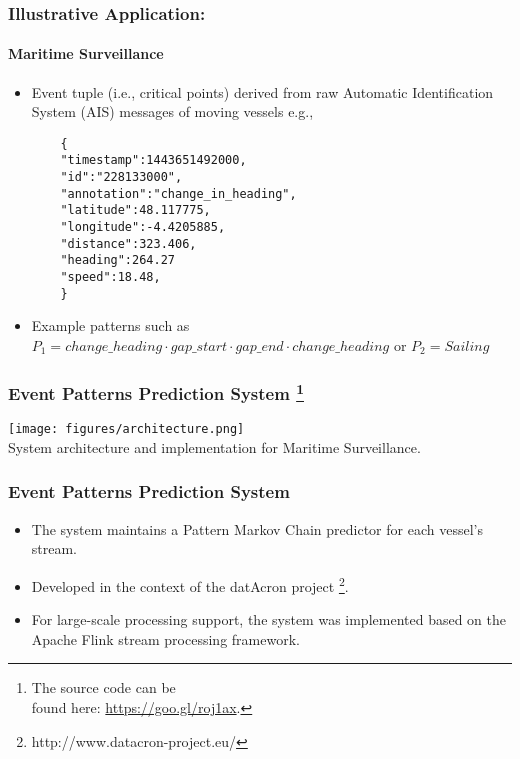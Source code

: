 \begin{frame}[fragile]

	\frametitle{Illustrative Application:}
    \framesubtitle{Maritime Surveillance}
	\begin{itemize}
		\item<only@1> Event tuple (i.e., critical points) derived from raw Automatic Identification System (AIS) messages of moving vessels e.g., 
		\begin{verbatim}
	{
	"timestamp":1443651492000,
	"id":"228133000",
	"annotation":"change_in_heading",
	"latitude":48.117775,
	"longitude":-4.4205885,
	"distance":323.406,
	"heading":264.27
	"speed":18.48,
	}
	\end{verbatim}
	
		\item<only@1> Example patterns such as 
		$P_1=\mathit{change\_heading} \cdot \mathit{gap\_start} \cdot \mathit{gap\_end} \cdot 
		\mathit{change\_heading}$ or $P_2=\mathit{Sailing}$
	\end{itemize}
\end{frame}


\frame
{
	\frametitle{Event Patterns Prediction System \footnote{ The source code can be\\ found here: \url{https://goo.gl/roj1ax}.}}
	\begin{center}
		\texttt{[image: figures/architecture.png]}	\linebreak\\
	 System architecture and implementation for Maritime Surveillance.
		
	\end{center}
}


\frame
{
	\frametitle{Event Patterns Prediction System}
	\begin{itemize}
		
		\item<only@1> The system maintains a Pattern Markov Chain predictor for each vessel's stream. 
		\item<only@1> Developed in the context of the datAcron project \footnote{http://www.datacron-project.eu/}.
		\item<only@1> For large-scale processing support, the system was implemented based on the Apache Flink \citep{carbone2015apache} stream processing framework. 
	\end{itemize}
}